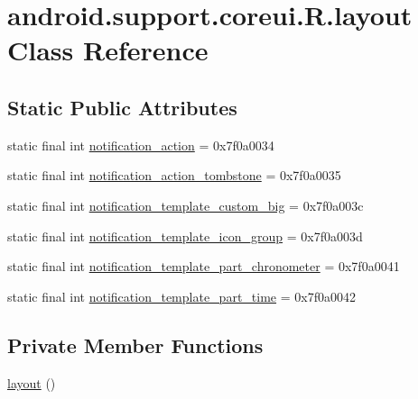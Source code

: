 \hypertarget{classandroid_1_1support_1_1coreui_1_1_r_1_1layout}{}\section{android.\+support.\+coreui.\+R.\+layout Class Reference}
\label{classandroid_1_1support_1_1coreui_1_1_r_1_1layout}
\subsection*{Static Public Attributes}
\begin{DoxyCompactItemize}
\item 
static final int \mbox{\hyperlink{classandroid_1_1support_1_1coreui_1_1_r_1_1layout_a1dda41cfcdb2fd191b6eec11290949a6}{notification\+\_\+action}} = 0x7f0a0034
\item 
static final int \mbox{\hyperlink{classandroid_1_1support_1_1coreui_1_1_r_1_1layout_af6e1c6ee8d56914a4fb8eeb45a34974d}{notification\+\_\+action\+\_\+tombstone}} = 0x7f0a0035
\item 
static final int \mbox{\hyperlink{classandroid_1_1support_1_1coreui_1_1_r_1_1layout_a77a5624486e61ded730f4089ff13ff0f}{notification\+\_\+template\+\_\+custom\+\_\+big}} = 0x7f0a003c
\item 
static final int \mbox{\hyperlink{classandroid_1_1support_1_1coreui_1_1_r_1_1layout_aae7fb0b25261997aa462aa8c530778c9}{notification\+\_\+template\+\_\+icon\+\_\+group}} = 0x7f0a003d
\item 
static final int \mbox{\hyperlink{classandroid_1_1support_1_1coreui_1_1_r_1_1layout_a97537d127c2746ea629497a3ad4cab14}{notification\+\_\+template\+\_\+part\+\_\+chronometer}} = 0x7f0a0041
\item 
static final int \mbox{\hyperlink{classandroid_1_1support_1_1coreui_1_1_r_1_1layout_a102d25ab2960dcd40dcace441e1fe808}{notification\+\_\+template\+\_\+part\+\_\+time}} = 0x7f0a0042
\end{DoxyCompactItemize}
\subsection*{Private Member Functions}
\begin{DoxyCompactItemize}
\item 
\mbox{\hyperlink{classandroid_1_1support_1_1coreui_1_1_r_1_1layout_a7a07308925510865b0b94d4a48aa7ce3}{layout}} ()
\end{DoxyCompactItemize}



